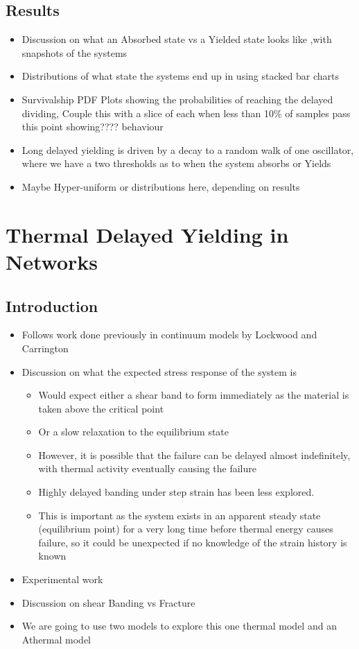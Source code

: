 \documentclass{library/duthesis}
\begin{document}
\section{Results}
\begin{itemize}
     \item Discussion on what an Absorbed state vs a Yielded state looks like ,with snapshots of the systems
    \item Distributions of what state the systems end up in using stacked bar charts
    \item Survivalship PDF Plots showing the probabilities of reaching the delayed dividing, Couple this with a slice of each when less than 10\% of samples pass this point showing???? behaviour
    \item Long delayed yielding is driven by a decay to a random walk of one oscillator, where we have a two thresholds as to when the system absorbs or Yields
    \item Maybe Hyper-uniform or distributions here, depending on results
\end{itemize}

\chapter{Thermal Delayed Yielding in Networks}
\section{Introduction}
\begin{itemize}
    \item Follows work done previously in continuum models by Lockwood and Carrington
    \item Discussion on what the expected stress response of the system is
    \begin{itemize}
        \item Would expect either a shear band to form immediately as the material is taken above the critical point
        \item Or a slow relaxation to the equilibrium state
        \item However, it is possible that the failure can be delayed almost indefinitely, with thermal activity eventually causing the failure
        \item Highly delayed banding under step strain has been less explored.
        \item This is important as the system exists in an apparent steady state (equilibrium point) for a very long time before thermal energy causes failure, so it could be unexpected if no knowledge of the strain history is known
    \end{itemize}
    \item Experimental work
    \item Discussion on shear Banding vs Fracture
    \item We are going to use two models to explore this one thermal model and an Athermal model 
\end{itemize}
\end{document}
